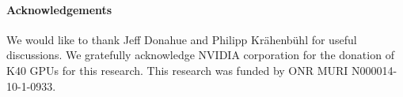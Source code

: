 \documentclass[10pt,twocolumn,letterpaper]{article}
\begin{document}
\paragraph{Acknowledgements}
We would like to thank Jeff Donahue and Philipp Kr\"ahenb\"uhl for useful discussions. 
We  gratefully acknowledge NVIDIA corporation for the donation of K40 GPUs for this research. This research was funded by ONR MURI N000014-10-1-0933.  




{\small


}
\end{document}
